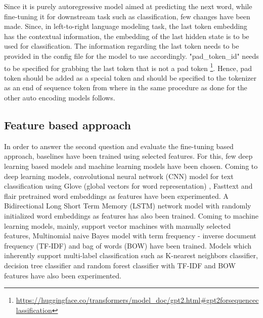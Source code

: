 Since it is purely autoregressive model aimed at predicting the next word, while fine-tuning it for downstream task such as classification, few changes have been made. Since, in left-to-right language modeling task, the last token embedding has the contextual information, the embedding of the last hidden state is to be used for classification. The information regarding the last token needs to be provided in the config file for the model to use accordingly. "pad\_token\_id" needs to be specified for grabbing the last token that is not a pad token \footnote{\url{https://huggingface.co/transformers/model_doc/gpt2.html#gpt2forsequenceclassification}}. Hence, pad token should be added as a special token and should be specified to the tokenizer as an end of sequence token from where in the same procedure as done for the other auto encoding models follows.

\subsection{Feature based approach}
In order to answer the second question and evaluate the fine-tuning based approach, baselines have been trained using selected features. For this, few deep learning based models and machine learning models have been chosen. Coming to deep learning models, convolutional neural network (CNN) model for text classification using Glove (global vectors for word representation) \cite{pennington2014glove}, Fasttext  \cite{joulin2017bag} and flair  \cite{akbik2019flair} pretrained word embeddings as features have been experimented. A Bidirectional Long Short Term Memory (LSTM) network model with randomly initialized word embeddings as features has also been trained. Coming to machine learning models, mainly, support vector machines with manually selected features, Multinomial naive Bayes model with term frequency - inverse document frequency (TF-IDF) and bag of words (BOW) have been trained. Models which inherently support multi-label classification such as K-nearest neighbors classifier, decision tree classifier and random forest classifier with TF-IDF and BOW features have also been experimented.

